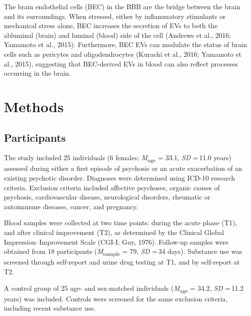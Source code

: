\documentclass[authordate, empirical, issue]{jote-new-article}
\begin{document}
	The brain endothelial cells (BEC) in the BBB are the bridge between the brain and its surroundings. When stressed, either by inflammatory stimulants or mechanical stress alone, BEC increases the secretion of EVs to both the abluminal (brain) and luminal (blood) side of the cell (Andrews et al., 2016; Yamamoto et al., 2015). Furthermore, BEC EVs can modulate the status of brain cells such as pericytes and oligodendrocytes (Kurachi et al., 2016; Yamamoto et al., 2015), suggesting that BEC-derived EVs in blood can also reflect processes occurring in the brain.











	\section{Methods}



	\subsection{Participants}



	The study included 25 individuals (6 females; \emph{M}\textsubscript{age} = 33.1, \emph{SD }= 11.0 years) assessed during either a first episode of psychosis or an acute exacerbation of an existing psychotic disorder. Diagnoses were determined using ICD-10 research criteria. Exclusion criteria included affective psychoses, organic causes of psychosis, cardiovascular disease, neurological disorders, rheumatic or autoimmune diseases, cancer, and pregnancy.







	Blood samples were collected at two time points: during the acute phase (T1), and after clinical improvement (T2), as determined by the Clinical Global Impression--Improvement Scale (CGI-I; Guy, 1976). Follow-up samples were obtained from 18 participants (\emph{M}\textsubscript{sample} = 79, \emph{SD }= 34 days). Substance use was screened through self-report and urine drug testing at T1, and by self-report at T2.







	A control group of 25 age- and sex-matched individuals (\emph{M}\textsubscript{age} = 34.2, \emph{SD }= 11.2 years) was included. Controls were screened for the same exclusion criteria, including recent substance use.
\end{document}
